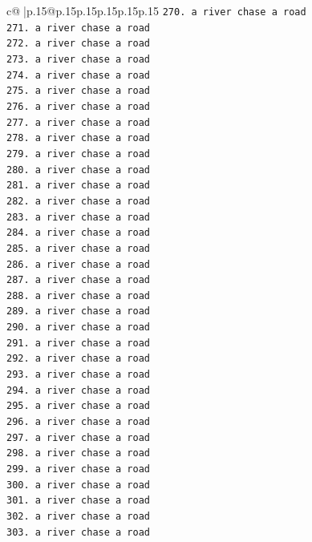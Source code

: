 \documentclass{article}
\begin{document}
{\begin{supertabular}{c@{$\;$}|p{.15\linewidth}@{}p{.15\linewidth}p{.15\linewidth}p{.15\linewidth}p{.15\linewidth}p{.15\linewidth}}
{{{\texttt{270. a river chase a road} \\
\texttt{271. a river chase a road} \\
\texttt{272. a river chase a road} \\
\texttt{273. a river chase a road} \\
\texttt{274. a river chase a road} \\
\texttt{275. a river chase a road} \\
\texttt{276. a river chase a road} \\
\texttt{277. a river chase a road} \\
\texttt{278. a river chase a road} \\
\texttt{279. a river chase a road} \\
\texttt{280. a river chase a road} \\
\texttt{281. a river chase a road} \\
\texttt{282. a river chase a road} \\
\texttt{283. a river chase a road} \\
\texttt{284. a river chase a road} \\
\texttt{285. a river chase a road} \\
\texttt{286. a river chase a road} \\
\texttt{287. a river chase a road} \\
\texttt{288. a river chase a road} \\
\texttt{289. a river chase a road} \\
\texttt{290. a river chase a road} \\
\texttt{291. a river chase a road} \\
\texttt{292. a river chase a road} \\
\texttt{293. a river chase a road} \\
\texttt{294. a river chase a road} \\
\texttt{295. a river chase a road} \\
\texttt{296. a river chase a road} \\
\texttt{297. a river chase a road} \\
\texttt{298. a river chase a road} \\
\texttt{299. a river chase a road} \\
\texttt{300. a river chase a road} \\
\texttt{301. a river chase a road} \\
\texttt{302. a river chase a road} \\
\texttt{303. a river chase a road} \\
}}}
\end{supertabular}}
\end{document}

